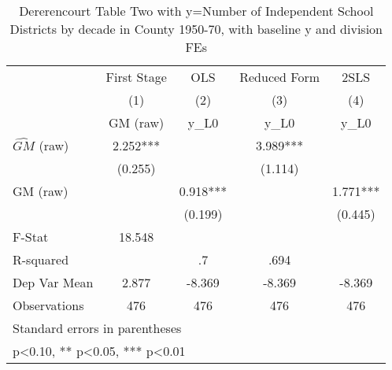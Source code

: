 \begin{table}[htbp]\centering
\def\sym#1{\ifmmode^{#1}\else\(^{#1}\)\fi}
\caption{Dererencourt Table Two with y=Number of Independent School Districts by decade in County 1950-70, with baseline y and division FEs}
\begin{tabular}{l*{4}{c}}
\toprule
                    & First Stage   &         OLS   &Reduced Form   &        2SLS   \\
                    &\multicolumn{1}{c}{(1)}&\multicolumn{1}{c}{(2)}&\multicolumn{1}{c}{(3)}&\multicolumn{1}{c}{(4)}\\
                    &\multicolumn{1}{c}{GM  (raw)}&\multicolumn{1}{c}{y\_L0}&\multicolumn{1}{c}{y\_L0}&\multicolumn{1}{c}{y\_L0}\\
\midrule
$\hat{GM}$ (raw)    &       2.252***&               &       3.989***&               \\
                    &     (0.255)   &               &     (1.114)   &               \\
\addlinespace
GM  (raw)           &               &       0.918***&               &       1.771***\\
                    &               &     (0.199)   &               &     (0.445)   \\
\midrule
F-Stat              &      18.548   &               &               &               \\
R-squared           &               &          .7   &        .694   &               \\
Dep Var Mean        &       2.877   &      -8.369   &      -8.369   &      -8.369   \\
Observations        &         476   &         476   &         476   &         476   \\
\bottomrule
\multicolumn{5}{l}{\footnotesize Standard errors in parentheses}\\
\multicolumn{5}{l}{\footnotesize * p<0.10, ** p<0.05, *** p<0.01}\\
\end{tabular}
\end{table}
